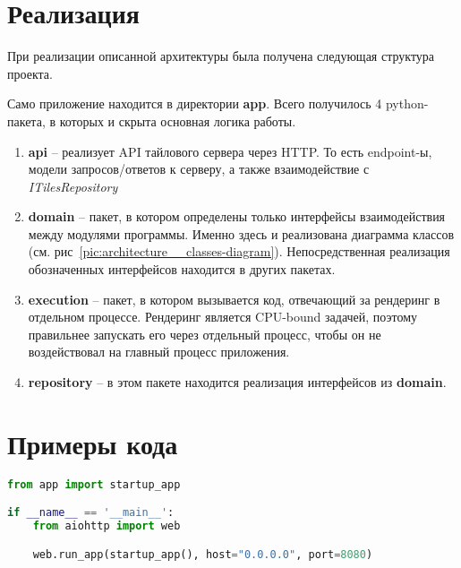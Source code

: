 \section*{\Large{Реализация}}

При реализации описанной архитектуры была получена следующая структура проекта.

Само приложение находится в директории \textbf{app}.
Всего получилось 4 python-пакета, в которых и скрыта основная логика работы.
\begin{enumerate}
    \item \textbf{api} -- реализует API тайлового сервера через HTTP. То есть endpoint-ы,
    модели запросов/ответов к серверу, а также взаимодействие с \textit{ITilesRepository}
    \item \textbf{domain} -- пакет, в котором определены только интерфейсы взаимодействия между модулями программы.
    Именно здесь и реализована диаграмма классов (см. рис\ \ref{pic:architecture__classes-diagram}). Непосредственная
    реализация обозначенных интерфейсов находится в других пакетах.
    \item \textbf{execution} -- пакет, в котором вызывается код, отвечающий за рендеринг в отдельном процессе.
    Рендеринг является CPU-bound задачей, поэтому правильнее
    запускать его через отдельный процесс, чтобы он не воздействовал на главный процесс приложения.
    \item \textbf{repository} -- в этом пакете находится реализация интерфейсов из \textbf{domain}.
\end{enumerate}

\section*{\Large{Примеры кода}}

\begin{lstlisting}[language=Python, caption=main.py, captionpos=b]
from app import startup_app

if __name__ == '__main__':
    from aiohttp import web

    web.run_app(startup_app(), host="0.0.0.0", port=8080)
\end{lstlisting}
